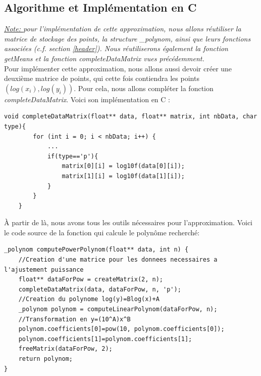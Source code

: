 \subsection{Algorithme et Implémentation en C}
\textit{\underline{Note: } pour l'implémentation de cette approximation, nous allons réutiliser la matrice de stockage des points, la structure \_polynom, ainsi que leurs fonctions associées (c.f. section \ref{header}). Nous réutiliserons également la fonction getMeans et la fonction completeDataMatrix vues précédemment.}\vspace{5pt}\\
Pour implémenter cette approximation, nous allons aussi devoir créer une deuxième matrice de points, qui cette fois contiendra les points $(log(x_i), log(y_i))$. Pour cela, nous allons compléter la fonction \textit{completeDataMatrix}. Voici son implémentation en C :\\
\begin{lstlisting}[mathescape=true, basicstyle=\fontsize{8}{10}\selectfont]
    void completeDataMatrix(float** data, float** matrix, int nbData, char type){
        for (int i = 0; i < nbData; i++) {
            ...
            if(type=='p'){
                matrix[0][i] = log10f(data[0][i]);
                matrix[1][i] = log10f(data[1][i]);
            }
        }
    }       
\end{lstlisting}
À partir de là, nous avons tous les outils nécessaires pour l'approximation. Voici le code source de la fonction qui calcule le polynôme recherché:\\
\begin{lstlisting}[mathescape=true, basicstyle=\fontsize{8}{10}\selectfont]
_polynom computePowerPolynom(float** data, int n) {
    //Creation d'une matrice pour les donnees necessaires a l'ajustement puissance
    float** dataForPow = createMatrix(2, n);
    completeDataMatrix(data, dataForPow, n, 'p');
    //Creation du polynome log(y)=Blog(x)+A
    _polynom polynom = computeLinearPolynom(dataForPow, n);
    //Transformation en y=(10^A)x^B
    polynom.coefficients[0]=pow(10, polynom.coefficients[0]);
    polynom.coefficients[1]=polynom.coefficients[1];
    freeMatrix(dataForPow, 2);
    return polynom;
}
\end{lstlisting}
\newpage
